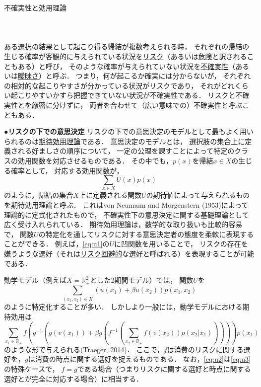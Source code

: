 \documentclass[11pt,a4paper]{article}
\begin{document}
\noindent
不確実性と効用理論\\
\ \\
\ \\
\ \\

ある選択の結果として起こり得る帰結が複数考えられる時，
それぞれの帰結の生じる確率が客観的に与えられている状況を\underline{リスク}（あるいは\underline{危険}と訳されることもある）と呼び，
そのような確率が与えられていない状況を\underline{不確実性}（あるいは\underline{曖昧さ}）と呼ぶ．
つまり，何が起こるか確実には分からないが，
それぞれの相対的な起こりやすさが分かっている状況がリスクであり，
それがどれくらい起こりやすいかすら把握できていない状況が不確実性である．
リスクと不確実性とを厳密に分けずに，
両者を合わせて（広い意味での）不確実性と呼ぶこともある．

\noindent\textbf{●リスクの下での意思決定}\hspace{0.5em}
リスクの下での意思決定のモデルとして最もよく用いられるのは\underline{期待効用理論}である．
意思決定のモデルとは，
選択肢の集合上に定義される好ましさの順序について，
一定の公理を課すことによって特定のクラスの効用関数を対応させるものである．
その中でも，$p(x)$を帰結$x\in X$の生じる確率として，
対応する効用関数が，
\begin{equation}\label{eq:u1}%
  \sum_{x\in X}U(x)p(x)
\end{equation}
のように，帰結の集合$X$上に定義される関数$U$の期待値によって与えられるものを期待効用理論と呼ぶ．
これはvon Neumann and Morgenstern (1953)によって理論的に定式化されたもので，
不確実性下の意思決定に関する基礎理論として広く受け入れられている．
期待効用理論は，数学的な取り扱いも比較的容易で，
関数$U$の特定化を通してリスクに対する意思決定者の態度を柔軟に表現することができる．
例えば，\eqref{eq:u1}の$U$に凹関数を用いることで，
リスクの存在を嫌うような選好（それは\underline{リスク回避的}な選好と呼ばれる）を表現することが可能である．

動学モデル（例えば$X=\mathbb{R}^{2}_{+}$とした2期間モデル）では，
関数$U$を
\begin{equation}\label{eq:u2}%
  \sum_{(x_{1},x_{2})\in X}\left(u(x_{1}) + \beta u(x_{2})\right)p(x_{1},x_{2})
\end{equation}
のように特定化することが多い．
しかしより一般には，動学モデルにおける期待効用は
\begin{equation}\label{eq:u3}%
  \sum_{x_{1}\in \mathbb{R}_{+}}f \left( g^{-1} \left(g (v(x_{1})) + \beta g \left(f^{-1} \left(\sum_{x_{2}\in \mathbb{R}_{+}}f \left(v(x_{2})\right)p(x_{2}|x_{1})\right) \right) \right)  \right)p(x_{1})
\end{equation}
のような形で与えられる(Traeger, 2014)．
ここで，$f$は消費のリスクに関する選好を，$g$は消費の時点に関する選好を捉えるものである．
なお，\eqref{eq:u2}は\eqref{eq:u3}の特殊ケースで，
$f=g$である場合（つまりリスクに関する選好と時点に関する選好とが完全に対応する場合）に相当する．
\end{document}
